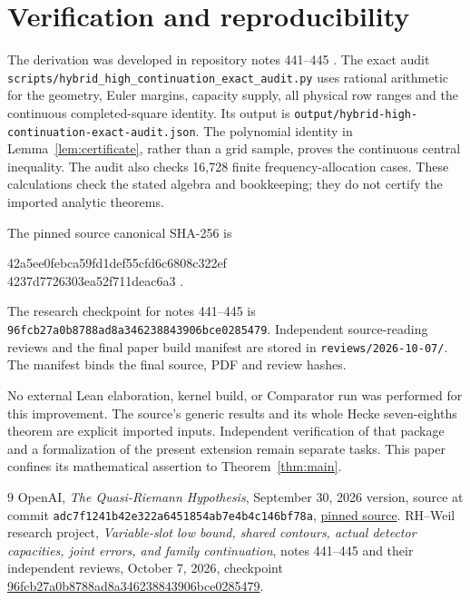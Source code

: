 \documentclass[11pt,a4paper]{article}
\theoremstyle{definition}
\newcommand{\src}[1]{\nolinkurl{#1}}
\begin{document}
\clearpage
\appendix
\section{Verification and reproducibility}
\label{app:verification}
The derivation was developed in repository notes 441--445
\cite{Project}. The exact audit
\src{scripts/hybrid_high_continuation_exact_audit.py}
uses rational arithmetic for the geometry, Euler margins,
capacity supply, all physical row ranges and the continuous
completed-square identity. Its output is
\src{output/hybrid-high-continuation-exact-audit.json}.
The polynomial identity in Lemma~\ref{lem:certificate}, rather than
a grid sample, proves the continuous central inequality.
The audit also checks 16,728 finite frequency-allocation cases.
These calculations check the stated algebra and bookkeeping;
they do not certify the imported analytic theorems.

The pinned source canonical SHA-256 is
\begin{center}\small\ttfamily
42a5ee0febca59fd1def55cfd6c6808c322ef\\
4237d7726303ea52f711deac6a3 .
\end{center}
The research checkpoint for notes 441--445 is
\src{96fcb27a0b8788ad8a346238843906bce0285479}.
Independent source-reading reviews and the final paper build
manifest are stored in \src{reviews/2026-10-07/}.
The manifest binds the final source, PDF and review hashes.

No external Lean elaboration, kernel build, or Comparator run was
performed for this improvement. The source's generic results and
its whole Hecke seven-eighths theorem are explicit imported inputs.
Independent verification of that package and a formalization of
the present extension remain separate tasks. This paper confines
its mathematical assertion to Theorem~\ref{thm:main}.

\begin{thebibliography}{9}
OpenAI, \emph{The Quasi-Riemann Hypothesis},
September 30, 2026 version, source at commit
\src{adc7f1241b42e322a6451854ab7e4b4c146bf78a},
\href{https://github.com/openai/math/blob/adc7f1241b42e322a6451854ab7e4b4c146bf78a/preprints/The-Quasi-Riemann-Hypothesis-September-30-2026/build/paper.tex}{pinned source}.
RH--Weil research project, \emph{Variable-slot low bound, shared
contours, actual detector capacities, joint errors, and family
continuation}, notes 441--445 and their independent reviews,
October 7, 2026, checkpoint
\href{https://github.com/lixiang90/RH-Weil/tree/96fcb27a0b8788ad8a346238843906bce0285479}{96fcb27a0b8788ad8a346238843906bce0285479}.
\end{thebibliography}
\end{document}
